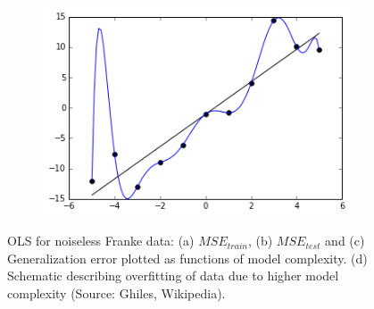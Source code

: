 \begin{figure}[htb]
\begin{subfigure}{.5\textwidth}
  \caption{}
  \label{fig:ols3}
\end{subfigure}
\begin{subfigure}{.45\textwidth}
  \centering
  \includegraphics[width=.9\linewidth]{Images/Overfitted_Data.png}
  \caption{}
  \label{fig:overfit}
\end{subfigure}
\caption{OLS for noiseless Franke data: (a) $MSE_{train}$, (b) $MSE_{test}$ and (c) Generalization error plotted as functions of model complexity. (d) Schematic describing overfitting of data due to higher model complexity (Source: Ghiles, Wikipedia). }
\label{fig:OLS1}
\end{figure}


